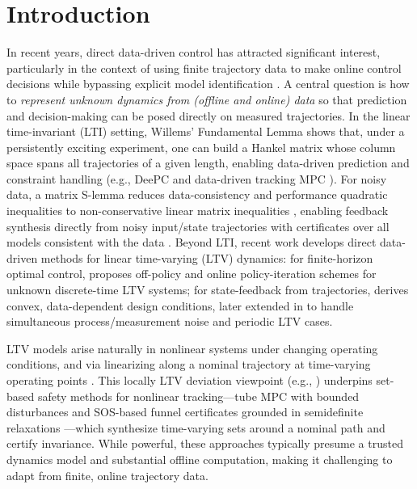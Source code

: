 \documentclass[letterpaper, 10 pt, conference]{ieeeconf}
\begin{document}
\section{Introduction}\label{sec:intro}
In recent years, direct data-driven control has attracted significant interest, particularly in the context of using finite trajectory data to make online control decisions while bypassing explicit model identification \cite{Hou2013FromMC}. A central question is how to \emph{represent unknown dynamics from (offline and online) data} so that prediction and decision-making can be posed directly on measured trajectories. In the linear time-invariant (LTI) setting, Willems’ Fundamental Lemma \cite{Willems2005FundamentalLemma} shows that, under a persistently exciting experiment, one can build a Hankel matrix whose column space spans all trajectories of a given length, enabling data-driven prediction and constraint handling (e.g., DeePC \cite{Coulson2019DeePC} and data-driven tracking MPC \cite{Berberich2022LTMPCCD}). For noisy data, a matrix S-lemma reduces data-consistency and performance quadratic inequalities to non-conservative linear matrix inequalities \cite{Boyd1994LMI}, enabling feedback synthesis directly from noisy input/state trajectories with certificates over all models consistent with the data \cite{vanWaarde2020MatrixSLemma}. Beyond LTI, recent work develops direct data-driven methods for linear time-varying (LTV) dynamics: for finite-horizon optimal control, \cite{Pang2018FiniteOptimal} proposes off-policy and online policy-iteration schemes for unknown discrete-time LTV systems; for state-feedback from trajectories, \cite{Nortmann2020CDC_LTV} derives convex, data-dependent design conditions, later extended in \cite{Nortmann2023TAC_LTV} to handle simultaneous process/measurement noise and periodic LTV cases.

LTV models arise naturally in nonlinear systems under changing operating conditions, and via linearizing along a nominal trajectory at time-varying operating points \cite{Kamen2010LTV}. This locally LTV deviation viewpoint (e.g., \cite{Reynolds2020TIFS}) underpins set-based safety methods for nonlinear tracking—tube MPC with bounded disturbances \cite{MAYNE2005219,RAKOVIC20121631} and SOS-based funnel certificates grounded in semidefinite relaxations \cite{Parrilo2003,Reynolds2020}—which synthesize time-varying sets around a nominal path and certify invariance. While powerful, these approaches typically presume a trusted dynamics model and substantial offline computation, making it challenging to adapt from finite, online trajectory data.
\end{document}

